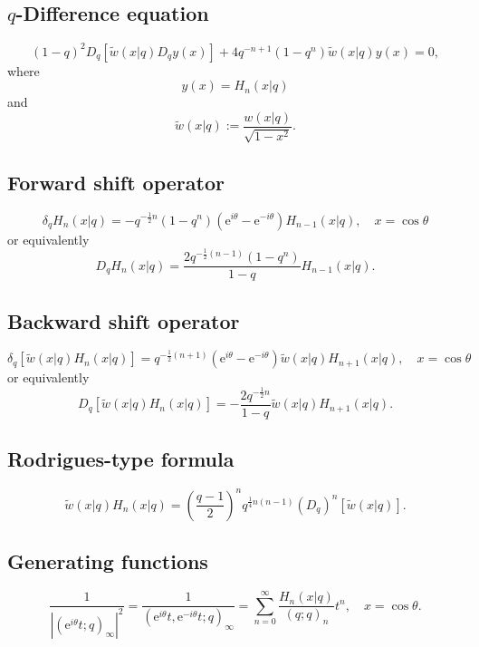 \documentclass[envcountchap,graybox]{svmono}
\newcommand{\e}{\textrm{e}}
\begin{document}
{{\subsection*{$q$-Difference equation}
\begin{equation}
\label{dvContqHermite}
(1-q)^2D_q\left[{\tilde w}(x|q)D_qy(x)\right]+4q^{-n+1}(1-q^n){\tilde w}(x|q)y(x)=0,
\end{equation}
where
$$y(x)=H_n(x|q)$$
and
$${\tilde w}(x|q):=\frac{w(x|q)}{\sqrt{1-x^2}}.$$

\subsection*{Forward shift operator}
\begin{equation}
\label{shift1ContqHermiteI}
\delta_qH_n(x|q)=-q^{-\frac{1}{2}n}(1-q^n)(\e^{i\theta}-\e^{-i\theta})H_{n-1}(x|q),
\quad x=\cos\theta
\end{equation}
or equivalently
\begin{equation}
\label{shift1ContqHermiteII}
D_qH_n(x|q)=\frac{2q^{-\frac{1}{2}(n-1)}(1-q^n)}{1-q}H_{n-1}(x|q).
\end{equation}

\subsection*{Backward shift operator}
\begin{equation}
\label{shift2ContqHermiteI}
\delta_q\left[{\tilde w}(x|q)H_n(x|q)\right]=
q^{-\frac{1}{2}(n+1)}(\e^{i\theta}-\e^{-i\theta})
{\tilde w}(x|q)H_{n+1}(x|q),\quad x=\cos\theta
\end{equation}
or equivalently
\begin{equation}
\label{shift2ContqHermiteII}
D_q\left[{\tilde w}(x|q)H_n(x|q)\right]=
-\frac{2q^{-\frac{1}{2}n}}{1-q}{\tilde w}(x|q)H_{n+1}(x|q).
\end{equation}

\subsection*{Rodrigues-type formula}
\begin{equation}
\label{RodContqHermite}
{\tilde w}(x|q)H_n(x|q)=\left(\frac{q-1}{2}\right)^nq^{\frac{1}{4}n(n-1)}
\left(D_q\right)^n\left[{\tilde w}(x|q)\right].
\end{equation}

\subsection*{Generating functions}
\begin{equation}
\label{GenContqHermite1}
\frac{1}{\left|(\e^{i\theta}t;q)_{\infty}\right|^2}=
\frac{1}{(\e^{i\theta}t,\e^{-i\theta}t;q)_{\infty}}=
\sum_{n=0}^{\infty}\frac{H_n(x|q)}{(q;q)_n}t^n,\quad x=\cos\theta.
\end{equation}

}}
\end{document}
